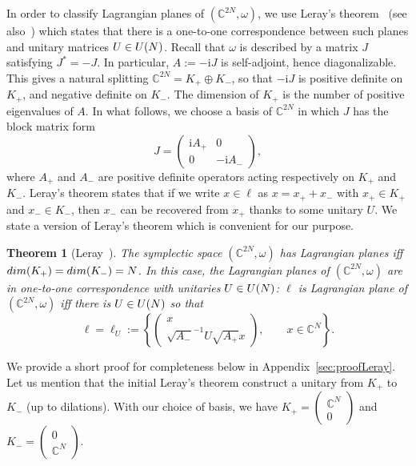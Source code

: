 \documentclass[11pt]{amsart}
\numberwithin{equation}{section} %
\newtheorem{theorem}{Theorem}[section]
\newcommand\1{{\mathds 1}}
\def\C{{\mathbb C}}
\def\ri{{\mathrm{i}}}
\def\U{{\rm U}}
\def\dim{{\rm dim }}
\begin{document}
In order to classify Lagrangian planes of $(\C^{2N}, \omega)$, we use  Leray's theorem~\cite{Ler-78} (see also~\cite[Lemma 7]{Gon-23})  which states that there is a one-to-one correspondence between such planes and unitary matrices $U \in \U(N)$. Recall that $\omega$ is described by a matrix $J$ satisfying $J^* = - J$. In particular, $A := -\ri J$ is self-adjoint, hence diagonalizable. This gives a natural splitting $\C^{2N} = K_+ \oplus K_-$, so that $- \ri J$ is positive definite on $K_+$, and negative definite on $K_-$. The dimension of $K_+$ is the number of positive eigenvalues of $A$. In what follows, we choose a basis of $\C^{2N}$ in which $J$ has the block matrix form
\begin{equation} \label{eq:def:J_A+_A-}
    J = \begin{pmatrix}
        \ri A_+ & 0 \\ 0 & - \ri A_-
    \end{pmatrix},
\end{equation}
where $A_+$ and $A_-$ are positive definite operators acting respectively on $K_+$ and $K_-$. Leray's theorem states that if we write $x \in \ell$ as $x = x_+ + x_-$ with $x_+ \in K_+$ and $x_- \in K_-$, then $x_-$ can be recovered from $x_+$ thanks to some unitary $U$. We state a version of Leray's theorem which is convenient for our purpose.

\begin{theorem}[Leray~\cite{Ler-78}] \label{th:Leray}
    The symplectic space $(\C^{2N}, \omega)$ has Lagrangian planes iff $\dim(K_+) = \dim(K_-) = N$. In this case, the Lagrangian planes of $(\C^{2N}, \omega)$ are in one-to-one correspondence with unitaries $U \in \U(N)$: $\ell$ is Lagrangian plane of $(\C^{2N}, \omega)$ iff there is $U \in \U(N)$ so that
    \begin{equation}
        \ell = \ell_U := \left\{ \begin{pmatrix}
            x \\ \sqrt{ A_-}^{-1} U \sqrt{A_+} x
        \end{pmatrix}, \qquad x \in \C^N
        \right\}.
    \end{equation}
\end{theorem}
We provide a short proof for completeness below in Appendix~\ref{sec:proofLeray}. Let us mention that the initial Leray's theorem construct a unitary from $K_+$ to $K_-$ (up to dilations). With our choice of basis, we have $K_+ = \begin{pmatrix}    \C^N \\ 0 \end{pmatrix}$ and $K_- = \begin{pmatrix} 0 \\ \C^N \end{pmatrix}$.
\end{document}
